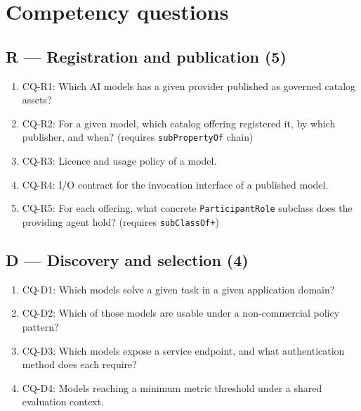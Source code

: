 \documentclass[11pt,a4paper]{article}
\newcommand{\code}[1]{\texttt{#1}}
\newcommand{\cq}[1]{\textsf{#1}}
\begin{document}
\section{Competency questions}\label{app:cqs}

\subsection*{R --- Registration and publication (5)}
\begin{enumerate}[label=\arabic*., leftmargin=*]
\item \cq{CQ-R1}: Which AI models has a given provider published as governed catalog assets?
\item \cq{CQ-R2}: For a given model, which catalog offering registered it, by which publisher, and when? (requires \code{subPropertyOf} chain)
\item \cq{CQ-R3}: Licence and usage policy of a model.
\item \cq{CQ-R4}: I/O contract for the invocation interface of a published model.
\item \cq{CQ-R5}: For each offering, what concrete \code{ParticipantRole} subclass does the providing agent hold? (requires \code{subClassOf+})
\end{enumerate}

\subsection*{D --- Discovery and selection (4)}
\begin{enumerate}[label=\arabic*., leftmargin=*]
\item \cq{CQ-D1}: Which models solve a given task in a given application domain?
\item \cq{CQ-D2}: Which of those models are usable under a non-commercial policy pattern?
\item \cq{CQ-D3}: Which models expose a service endpoint, and what authentication method does each require?
\item \cq{CQ-D4}: Models reaching a minimum metric threshold under a shared evaluation context.
\end{enumerate}
\end{document}
